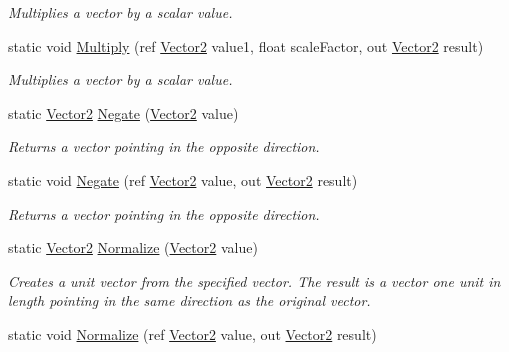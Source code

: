 \begin{DoxyCompactItemize}
\begin{DoxyCompactList}\small\item\em Multiplies a vector by a scalar value.\end{DoxyCompactList}\item 
static void \hyperlink{structMicrosoft_1_1Xna_1_1Framework_1_1Vector2_a894fb91d48108b2bfeaaa2819bba885b}{Multiply} (ref \hyperlink{structMicrosoft_1_1Xna_1_1Framework_1_1Vector2}{Vector2} value1, float scale\+Factor, out \hyperlink{structMicrosoft_1_1Xna_1_1Framework_1_1Vector2}{Vector2} result)
\begin{DoxyCompactList}\small\item\em Multiplies a vector by a scalar value.\end{DoxyCompactList}\item 
static \hyperlink{structMicrosoft_1_1Xna_1_1Framework_1_1Vector2}{Vector2} \hyperlink{structMicrosoft_1_1Xna_1_1Framework_1_1Vector2_a6958b244b2ef6b53614973a8da8ed92b}{Negate} (\hyperlink{structMicrosoft_1_1Xna_1_1Framework_1_1Vector2}{Vector2} value)
\begin{DoxyCompactList}\small\item\em Returns a vector pointing in the opposite direction.\end{DoxyCompactList}\item 
static void \hyperlink{structMicrosoft_1_1Xna_1_1Framework_1_1Vector2_a433d2f7cb16553f3bc53f0a0f0cda9b3}{Negate} (ref \hyperlink{structMicrosoft_1_1Xna_1_1Framework_1_1Vector2}{Vector2} value, out \hyperlink{structMicrosoft_1_1Xna_1_1Framework_1_1Vector2}{Vector2} result)
\begin{DoxyCompactList}\small\item\em Returns a vector pointing in the opposite direction.\end{DoxyCompactList}\item 
static \hyperlink{structMicrosoft_1_1Xna_1_1Framework_1_1Vector2}{Vector2} \hyperlink{structMicrosoft_1_1Xna_1_1Framework_1_1Vector2_a136377b6ac5c08b8f0d60fd207419f5c}{Normalize} (\hyperlink{structMicrosoft_1_1Xna_1_1Framework_1_1Vector2}{Vector2} value)
\begin{DoxyCompactList}\small\item\em Creates a unit vector from the specified vector. The result is a vector one unit in length pointing in the same direction as the original vector.\end{DoxyCompactList}\item 
static void \hyperlink{structMicrosoft_1_1Xna_1_1Framework_1_1Vector2_a72c09b5835de3258b1ab0b7cb69ed6b9}{Normalize} (ref \hyperlink{structMicrosoft_1_1Xna_1_1Framework_1_1Vector2}{Vector2} value, out \hyperlink{structMicrosoft_1_1Xna_1_1Framework_1_1Vector2}{Vector2} result)

\end{DoxyCompactItemize}
